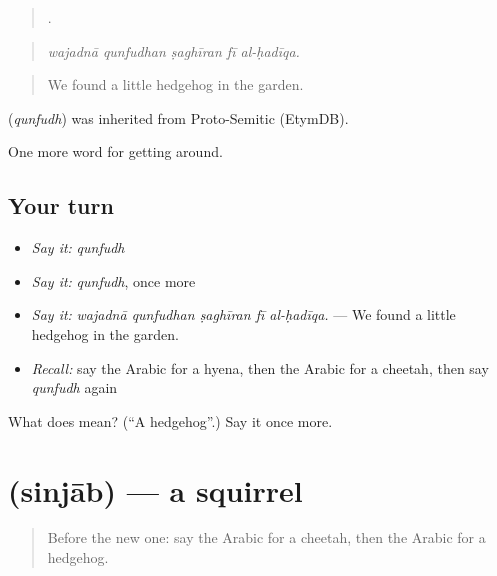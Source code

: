 \begin{quote}
    .
\end{quote}

\begin{quote}
\emph{wajadnā qunfudhan ṣaghīran fī al-ḥadīqa.}
\end{quote}

\begin{quote}
We found a little hedgehog in the garden.
\end{quote}

\begin{cousinweb}
\textbf{} (\emph{qunfudh}) was inherited from Proto-Semitic (EtymDB).
\end{cousinweb}

\begin{grammarlens}[title={What you've built}]
One more word for getting around.
\end{grammarlens}

\subsection*{Your turn}
\begin{itemize}
\raggedright
  \item \emph{Say it:} \emph{qunfudh}
  \item \emph{Say it:} \emph{qunfudh}, once more
  \item \emph{Say it:} \emph{wajadnā qunfudhan ṣaghīran fī al-ḥadīqa.} — We found a little hedgehog in the garden.
  \item \emph{Recall:} say the Arabic for a hyena, then the Arabic for a cheetah, then say \emph{qunfudh} again
\end{itemize}

\begin{tcolorbox}[breakable,colback=teal!4,colframe=teal!35!black,title={Before you move on}]
What does  mean? (\textquotedblleft{}A hedgehog\textquotedblright{}.) Say it once more.
\end{tcolorbox}
\section[\texorpdfstring{\ar{سنجاب} (sinjāb)}{سنجاب (sinjāb)}]{ (sinjāb) — a squirrel}

\label{lesson:AR-C475-sinjab}



\begin{quote}
Before the new one: say the Arabic for a cheetah, then the Arabic for a hedgehog.
\end{quote}


